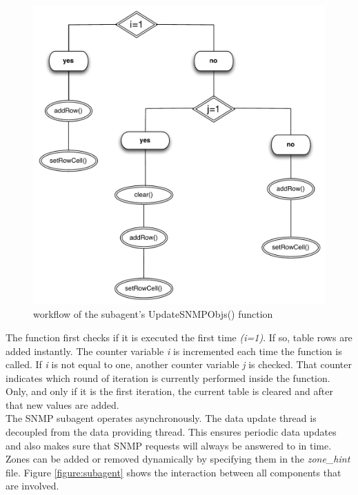 \begin{figure}[H]
\centering
\includegraphics[scale=0.5]{Images/workflow.pdf}
\caption{workflow of the subagent's UpdateSNMPObjs() function}
\label{figure:workflow}
\end{figure}

The function first checks if it is executed the first time \textit{(i=1)}. If so, table rows are added instantly. The counter variable \textit{i} is incremented each time the function is called. If \textit{i} is not equal to one, another counter variable \textit{j} is checked. That counter indicates which round of iteration is currently performed inside the function. Only, and only if it is the first iteration, the current table is cleared and after that new values are added.
\\
The SNMP subagent operates asynchronously. The data update thread is decoupled from the data providing thread. This ensures periodic data updates and also makes sure that SNMP requests will always be answered to in time. Zones can be added or removed dynamically by specifying them in the \textit{zone\_hint} file. Figure \ref{figure:subagent} shows the interaction between all components that are involved.


